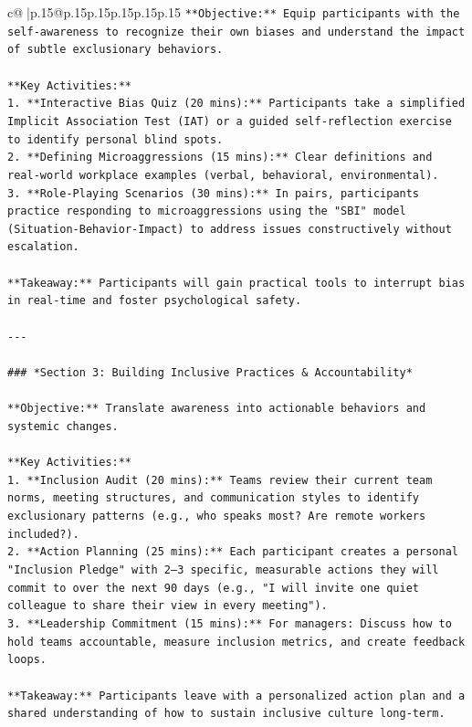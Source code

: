 \documentclass{article}
\begin{document}
{\begin{supertabular}{c@{$\;$}|p{.15\linewidth}@{}p{.15\linewidth}p{.15\linewidth}p{.15\linewidth}p{.15\linewidth}p{.15\linewidth}}
{{{\texttt{**Objective:** Equip participants with the self{-}awareness to recognize their own biases and understand the impact of subtle exclusionary behaviors.} \\
\\ 
\texttt{**Key Activities:**} \\
\texttt{1.  **Interactive Bias Quiz (20 mins):** Participants take a simplified Implicit Association Test (IAT) or a guided self{-}reflection exercise to identify personal blind spots.} \\
\texttt{2.  **Defining Microaggressions (15 mins):** Clear definitions and real{-}world workplace examples (verbal, behavioral, environmental).} \\
\texttt{3.  **Role{-}Playing Scenarios (30 mins):** In pairs, participants practice responding to microaggressions using the "SBI" model (Situation{-}Behavior{-}Impact) to address issues constructively without escalation.} \\
\\ 
\texttt{**Takeaway:** Participants will gain practical tools to interrupt bias in real{-}time and foster psychological safety.} \\
\\ 
\texttt{{-}{-}{-}} \\
\\ 
\texttt{\#\#\# *Section 3: Building Inclusive Practices \& Accountability*} \\
\\ 
\texttt{**Objective:** Translate awareness into actionable behaviors and systemic changes.} \\
\\ 
\texttt{**Key Activities:**} \\
\texttt{1.  **Inclusion Audit (20 mins):** Teams review their current team norms, meeting structures, and communication styles to identify exclusionary patterns (e.g., who speaks most? Are remote workers included?).} \\
\texttt{2.  **Action Planning (25 mins):** Each participant creates a personal "Inclusion Pledge" with 2–3 specific, measurable actions they will commit to over the next 90 days (e.g., "I will invite one quiet colleague to share their view in every meeting").} \\
\texttt{3.  **Leadership Commitment (15 mins):** For managers: Discuss how to hold teams accountable, measure inclusion metrics, and create feedback loops.} \\
\\ 
\texttt{**Takeaway:** Participants leave with a personalized action plan and a shared understanding of how to sustain inclusive culture long{-}term.} \\
}}}
\end{supertabular}}
\end{document}
